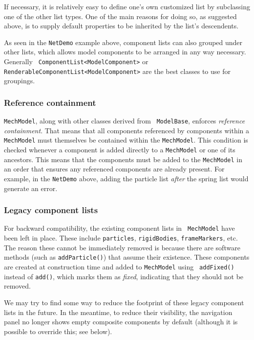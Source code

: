 \documentclass{article}
\begin{document}
If necessary, it is relatively easy to define one's own customized
list by subclassing one of the other list types. One of the main
reasons for doing so, as suggested above, is to supply default
properties to be inherited by the list's descendents.

As seen in the {\tt NetDemo} example above, component lists can also
grouped under other lists, which allows model components to be
arranged in any way necessary.  Generally {\tt
ComponentList<ModelComponent>} or {\tt
RenderableComponentList<ModelComponent>} are the best classes to use
for groupings.

\subsubsection*{Reference containment}

{\tt MechModel}, along with other classes derived from {\tt
ModelBase}, enforces {\it reference containment}. That means that all
components referenced by components within a {\tt MechModel} must
themselves be contained within the {\tt MechModel}.  This condition is
checked whenever a component is added directly to a {\tt MechModel} or
one of its ancestors. This means that the components must be added to
the {\tt MechModel} in an order that ensures any referenced components are
already present. For example, in the {\tt NetDemo} above, adding the
particle list {\it after} the spring list would generate an error.

\subsubsection*{Legacy component lists}

For backward compatibility, the existing component lists in {\tt
MechModel} have been left in place. These include {\tt particles},
{\tt rigidBodies}, {\tt frameMarkers}, etc. The reason these cannot be
immediately removed is because there are software methods (such as
{\tt addParticle()}) that assume their existence. These components are
created at construction time and added to {\tt MechModel} using {\tt
addFixed()} instead of {\tt add()}, which marks them as {\it fixed},
indicating that they should not be removed.

We may try to find some way to reduce the footprint of these legacy
component lists in the future. In the meantime, to reduce their
visibility, the navigation panel no longer shows empty composite
components by default (although it is possible to override this; see
below).
\end{document}
